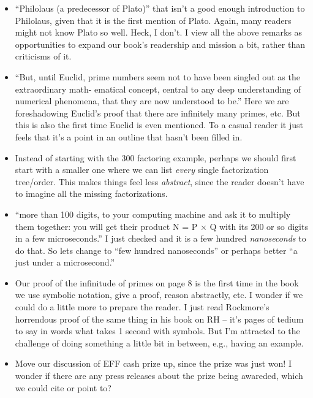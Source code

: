 \documentclass{article}
\begin{document}
\begin{itemize}
\item ``Philolaus (a predecessor of Plato)'' that isn't a good enough
  introduction to Philolaus, given that it is the first mention of
  Plato.  Again, many readers might not know Plato so well. Heck, I
  don't.  I view all the above remarks as opportunities to expand our
  book's readership and mission a bit, rather than criticisms of it. 

\item ``But, until Euclid, prime numbers seem not to have been singled
  out as the extraordinary math- ematical concept, central to any deep
  understanding of numerical phenomena, that they are now understood
  to be.''  Here we are foreshadowing Euclid's proof that there are
  infinitely many primes, etc.  But this is also the first time Euclid
  is even mentioned.  To a casual reader it just feels that it's a
  point in an outline that hasn't been filled in.

\item Instead of starting with the 300 factoring example, perhaps we
  should first start with a smaller one where we can list {\em every}
  single factorization tree/order.  This makes things feel less {\em
    abstract}, since the reader doesn't have to imagine all the
  missing factorizations.

\item ``more than 100 digits, to your computing machine and ask it to
  multiply them together: you will get their product N = P × Q with
  its 200 or so digits in a few microseconds.''  I just checked and it
  is a few hundred {\em nanoseconds} to do that.  So lets change to
  ``few hundred nanoseconds'' or perhaps better ``a just under a
  microsecond.''


\item Our proof of the infinitude of primes on page 8 is the first
  time in the book we use symbolic notation, give a proof, reason
  abstractly, etc.  I wonder if we could do a little more to prepare
  the reader.  I just read Rockmore's horrendous proof of the same
  thing in his book on RH -- it's pages of tedium to say in words what
  takes 1 second with symbols.  But I'm attracted to the challenge of
  doing something a little bit in between, e.g., having an example.

\item Move our discussion of EFF cash prize up, since the prize was
  just won!  I wonder if there are any press releases about the prize
  being awareded, which we could cite or point to?


\end{itemize}
\end{document}
